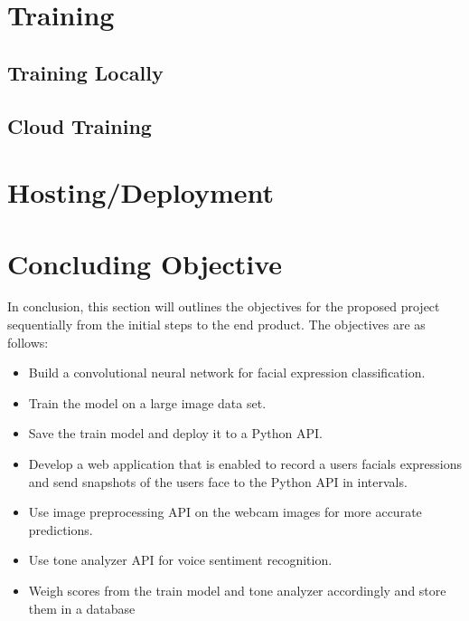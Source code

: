 \section{Training}
\subsection{Training Locally}
\subsection{Cloud Training}

\section{Hosting/Deployment}

\section{Concluding Objective}
In conclusion, this section will outlines the objectives for the proposed project sequentially from the initial steps to the end product. The objectives are as follows:

\begin{itemize}
	\item Build a convolutional neural network for facial expression classification.
	\item Train the model on a large image data set.
	\item Save the train model and deploy it to a Python API.
	\item Develop a web application that is enabled to record a users facials expressions and send snapshots of the users face to the Python API in intervals.
	\item Use image preprocessing API on the webcam images for more accurate predictions.
	\item Use tone analyzer API for voice sentiment recognition.
	\item Weigh scores from the train model and tone analyzer accordingly and store them in a database
\end{itemize}

